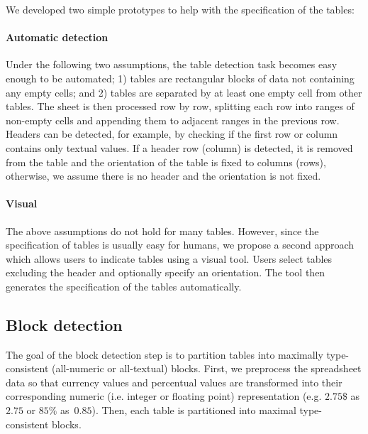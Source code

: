 \documentclass{IEEEtran}
\theoremstyle{definition}
\begin{document}
We developed two simple prototypes to help with the specification of the tables:


\paragraph{Automatic detection}
Under the following two assumptions, the table detection task becomes easy enough to be automated; 1) tables are rectangular blocks of data not containing any empty cells; and 2) tables are separated by at least one empty cell from other tables.
The sheet is then processed row by row, splitting each row into ranges of non-empty cells and appending them to adjacent ranges in the previous row.
Headers can be detected, for example, by checking if the first row or column contains only textual values. If a header row (column) is detected, it is removed from the table and the orientation of the table is fixed to columns (rows), otherwise, we assume there is no header and the orientation is not fixed.

\paragraph{Visual}
The above assumptions do not hold for many tables. However, since the specification of tables is usually easy for humans, we propose a second approach which allows users to indicate tables using a visual tool.
Users select tables excluding the header and optionally specify an orientation.
The tool then generates the specification of the tables automatically.





\subsection{Block detection} \label{sec:make_groups}
The goal of the block detection step is to partition tables into maximally type-consistent (all-numeric or all-textual) blocks.
First, we preprocess the spreadsheet data so that currency values and percentual values are transformed into their corresponding numeric (i.e. integer or floating point) representation (e.g. $2.75 \$$ as $2.75$ or $85\%$ as~$0.85$).
Then, each table is partitioned into maximal type-consistent blocks.
\end{document}
